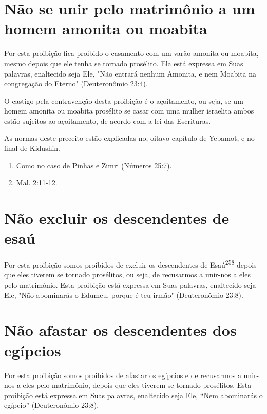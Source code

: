 \section{Não se unir pelo matrimônio a um homem amonita ou moabita}


Por esta proibição fica proibido o casamento com um varão amoni­ta ou
moabita, mesmo depois que ele tenha se tornado prosélito. Ela está
ex­pressa em Suas palavras, enaltecido seja Ele, "Não entrará nenhum
Amonita, e nem Moabita na congregação do Eterno" (Deuteronômio 23:4).

O castigo pela contravenção desta proibição é o açoitamento, ou se­ja,
se um homem amonita ou moabita prosélito se casar com uma mulher
israe­lita ambos estão sujeitos ao açoitamento, de acordo com a lei das
Escrituras.

As normas deste preceito estão explicadas no, oitavo capítulo de
Ye­bamot, e no final de Kidushin.


\begin{enumerate}
\def\labelenumi{\arabic{enumi}.}
\setcounter{enumi}{255}
\item
 
 Como no caso de Pinhas e Zimri (Números 25:7).
 
\item
 
 Mal. 2:11-12.
 
\end{enumerate}



\section{Não excluir os descendentes de esaú}

Por esta proibição somos proibidos de excluir os descendentes de
Esaú\textsuperscript{258} depois que eles tiverem se tornado prosélitos,
ou seja, de recusarmos a unir-nos a eles pelo matrimônio. Esta proibição
está expressa em Suas pala­vras, enaltecido seja Ele, "Não abominarás o
Edumeu, porque é teu irmão" (Deu­teronômio 23:8).


\section{Não afastar os descendentes dos egípcios}


Por esta proibição somos proibidos de afastar os egípcios e de
recu­sarmos a unir-nos a eles pelo matrimônio, depois que eles tiverem
se tornado prosélitos. Esta proibição está expressa em Suas palavras,
enaltecido seja Ele, ``Nem abominarás o egípcio'' (Deuteronômio 23:8).

